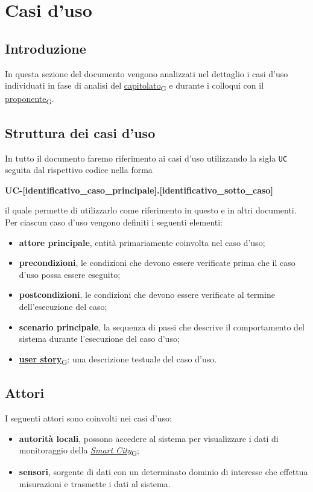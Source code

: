 \section{Casi d'uso}
\subsection{Introduzione}
In questa sezione del documento vengono analizzati nel dettaglio i casi d'uso individuati in fase di analisi del \href{https://7last.github.io/docs/pb/documentazione-interna/glossario\#capitolato}{capitolato\textsubscript{G}} e durante i colloqui con il \href{https://7last.github.io/docs/pb/documentazione-interna/glossario\#proponente}{proponente\textsubscript{G}}.

\subsection{Struttura dei casi d'uso}
In tutto il documento faremo riferimento ai casi d'uso utilizzando la sigla \texttt{UC} seguita dal rispettivo codice nella forma
\begin{center}
	\textbf{UC-[identificativo\_caso\_principale].[identificativo\_sotto\_caso]}
\end{center}
il quale permette di utilizzarlo come riferimento in questo e in altri documenti.\\
Per ciascun caso d'uso vengono definiti i seguenti elementi:
\begin{itemize}
	\item \textbf{attore principale}, entità primariamente coinvolta nel caso d'uso;
	\item \textbf{precondizioni}, le condizioni che devono essere verificate prima che il caso d'uso possa essere eseguito;
	\item \textbf{postcondizioni}, le condizioni che devono essere verificate al termine dell'esecuzione del caso;
	\item \textbf{scenario principale}, la sequenza di passi che descrive il comportamento del sistema durante l'esecuzione del caso d'uso;
	\item \href{https://7last.github.io/docs/pb/documentazione-interna/glossario\#user-story}{\textbf{user story}\textsubscript{G}}: una descrizione testuale del caso d'uso.
\end{itemize}

\subsection{Attori}
I seguenti attori sono coinvolti nei casi d'uso:
\begin{itemize}
	\item \textbf{autorità locali}, possono accedere al sistema per visualizzare i dati di monitoraggio della \href{https://7last.github.io/docs/pb/documentazione-interna/glossario\#smart-city}{\textit{Smart City}\textsubscript{G}};
	\item \textbf{sensori}, sorgente di dati con un determinato dominio di interesse che effettua misurazioni e trasmette i dati al sistema.
\end{itemize}

